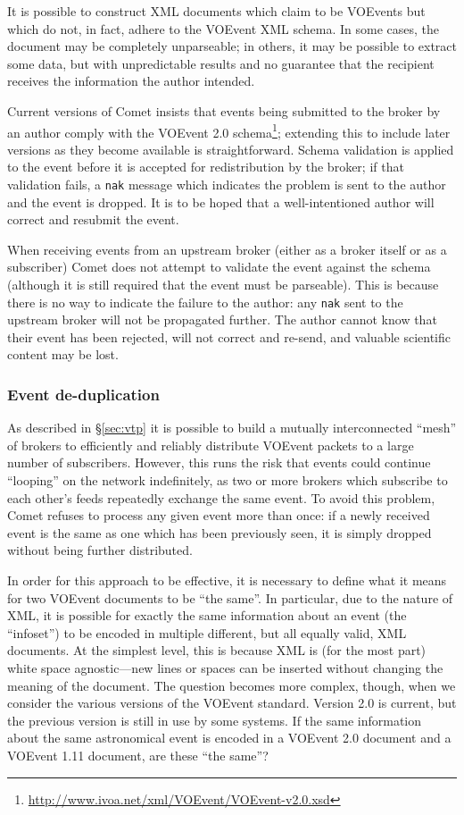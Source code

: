 \documentclass[5p,authoryear]{elsarticle}
\begin{document}
It is possible to construct XML documents which claim to be VOEvents but which
do not, in fact, adhere to the VOEvent XML schema. In some cases, the document
may be completely unparseable; in others, it may be possible to extract some
data, but with unpredictable results and no guarantee that the recipient
receives the information the author intended.

Current versions of Comet insists that events being submitted to the broker by
an author comply with the VOEvent 2.0
schema\footnote{\url{http://www.ivoa.net/xml/VOEvent/VOEvent-v2.0.xsd}};
extending this to include later versions as they become available is
straightforward. Schema validation is applied to the event before it is
accepted for redistribution by the broker; if that validation fails, a
\texttt{nak} message which indicates the problem is sent to the author and the
event is dropped. It is to be hoped that a well-intentioned author will
correct and resubmit the event.

When receiving events from an upstream broker (either as a broker itself or as
a subscriber) Comet does not attempt to validate the event against the schema
(although it is still required that the event must be parseable). This is
because there is no way to indicate the failure to the author: any
\texttt{nak} sent to the upstream broker will not be propagated further. The
author cannot know that their event has been rejected, will not correct and
re-send, and valuable scientific content may be lost.

\subsubsection{Event de-duplication}
\label{sec:design:dedup}

As described in \S\ref{sec:vtp} it is possible to build a mutually
interconnected ``mesh'' of brokers to efficiently and reliably distribute
VOEvent packets to a large number of subscribers. However, this runs the risk
that events could continue ``looping'' on the network indefinitely, as two or
more brokers which subscribe to each other's feeds repeatedly exchange the
same event. To avoid this problem, Comet refuses to process any given event
more than once: if a newly received event is the same as one which has been
previously seen, it is simply dropped without being further distributed.

In order for this approach to be effective, it is necessary to define what it
means for two VOEvent documents to be ``the same''. In particular, due to the
nature of XML, it is possible for exactly the same information about an event
(the ``infoset'') to be encoded in multiple different, but all equally valid,
XML documents. At the simplest level, this is because XML is (for the most
part) white space agnostic---new lines or spaces can be inserted without
changing the meaning of the document. The question becomes more complex,
though, when we consider the various versions of the VOEvent standard. Version
2.0 \citep{Seaman:2011} is current, but the previous version
\citep[1.1;][]{Seaman:2006} is still in use by some systems. If the same
information about the same astronomical event is encoded in a VOEvent 2.0
document and a VOEvent 1.11 document, are these ``the same''?
\end{document}
